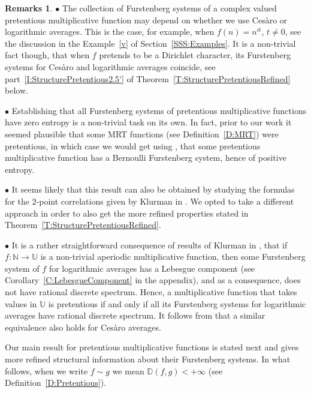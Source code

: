 \documentclass[11pt]{amsart}
\theoremstyle{definition}
\newtheorem*{remarks}{Remarks}
\newcommand{\D}{{\mathbb D}}
\newcommand{\N}{{\mathbb N}}
\newcommand{\U}{{\mathbb U}}
\begin{document}
 \begin{remarks}
 	$\bullet$    The collection of Furstenberg systems of a complex valued pretentious multiplicative function 	may depend on whether we use   Ces\`aro or logarithmic averages. This is the case, for  example, when    $f(n)=n^{it}$, $t\neq 0$,  see the discussion in the Example~\eqref{v} of Section~\ref{SSS:Examples}.  It is a non-trivial fact though, that      when $f$ pretends to be a Dirichlet character, its Furstenberg systems for Ces\`aro and logarithmic averages coincide, see part~\eqref{I:StructurePretentious2.5'} of  Theorem~\ref{T:StructurePretentiousRefined} below.
 	
 	$\bullet$ Establishing that all Furstenberg systems of pretentious multiplicative functions have zero entropy is a non-trivial task on its own.
 	In fact, prior to our work it seemed plausible  that some MRT functions  (see Definition~\ref{D:MRT}) were pretentious, in which case  we would get using \cite[Corollary~2.10]{GLR21},
 	that  some pretentious multiplicative function has a Bernoulli Furstenberg system, hence of positive entropy.
 	
 	$\bullet$ It seems likely that this result can also be obtained by studying the formulas for the $2$-point correlations given by Klurman in \cite{Kl17}. We opted to take a different approach
 	in order to also get the more refined properties stated in Theorem~\ref{T:StructurePretentiousRefined}.
 	
 	$\bullet$
 	It is a rather straightforward consequence of results of Klurman in \cite{Kl17}, that if  $f\colon \N\to \U$  is a non-trivial aperiodic multiplicative function, then  some Furstenberg system of $f$ for logarithmic averages has a Lebesgue component (see Corollary~\ref{C:LebesgueComponent} in the appendix), and as a consequence, does not have rational discrete spectrum.  Hence, a multiplicative function that takes values in $\U$ is pretentious  if and only if
 	all its Furstenberg systems for logarithmic averages have rational discrete  spectrum. It follows from \cite[Theorem~1.2]{KMT23} that a similar equivalence also holds for Ces\`aro averages.
 \end{remarks}
Our main result for pretentious multiplicative functions is stated next and %
  gives more refined structural information about their Furstenberg systems. In what follows, when we write $f\sim g$ we mean $\D(f,g)<+\infty$ (see Definition~\ref{D:Pretentious}).
\end{document}
